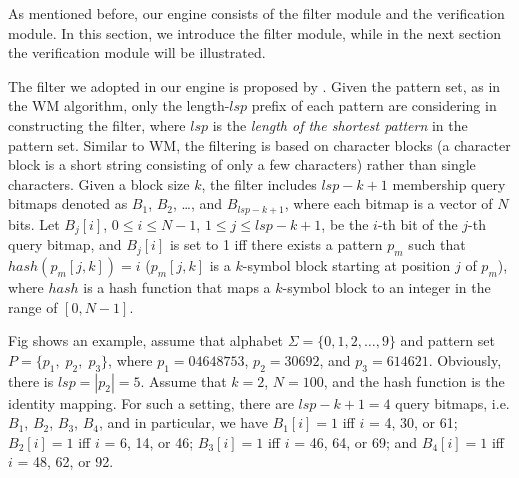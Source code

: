 \documentclass{article}
\begin{document}
As mentioned before, our engine consists of the filter module and the
verification module. In this section, we introduce the filter module,
while in the next section the verification module will be illustrated.


The filter we adopted in our engine is proposed by
\cite{Lee2013}. Given the pattern set, as in the WM algorithm, only
the length-$lsp$ prefix of each pattern are considering in
constructing the filter, where $lsp$ is the \emph{length of the
  shortest pattern} in the pattern set. Similar to WM, the filtering
is based on character blocks (a character block is a short string
consisting of only a few characters) rather than single
characters. Given a block size $k$, the filter includes $lsp-k+1$
membership query bitmaps denoted as $B_1$, $B_2$, \dots, and
$B_{lsp-k+1}$, where each bitmap is a vector of $N$ bits. Let
$B_j[i]$, $0 \leq i \leq N - 1$, $1 \leq j \leq lsp-k+1$, be the
$i$-th bit of the $j$-th query bitmap, and $B_j[i]$ is set to 1 iff
there exists a pattern $p_m$ such that $hash(p_m[j,k]) = i$
($p_m[j,k]$ is a $k$-symbol block starting at position $j$ of $p_m$),
where $hash$ is a hash function that maps a $k$-symbol block to an
integer in the range of $[0, N-1]$.

Fig shows an example, assume that alphabet
$\Sigma = \{0, 1, 2, \dots, 9\}$ and pattern set
$P = \{p_1,\; p_2,\; p_3\}$, where $p_1 = 04648753$, $p_2 = 30692$,
and $p_3 = 614621$. Obviously, there is $lsp = |p_2|= 5$. Assume that
$k = 2$, $N = 100$, and the hash function is the identity mapping. For
such a setting, there are $lsp - k + 1 = 4$ query bitmaps, i.e. $B_1$,
$B_2$, $B_3$, $B_4$, and in particular, we have $B_1[i] = 1$ iff $i$ =
4, 30, or 61; $B_2[i] = 1$ iff $i$ = 6, 14, or 46; $B_3[i] = 1$ iff
$i$ = 46, 64, or 69; and $B_4[i] = 1$ iff $i$ = 48, 62, or 92.

\end{document}
